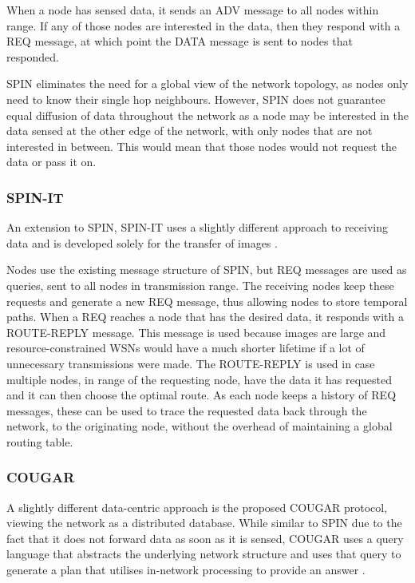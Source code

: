 When a node has sensed data, it sends an ADV message to all nodes within range. If any of those nodes are interested in the data, then they respond with a REQ message, at which point the DATA message is sent to nodes that responded.

SPIN eliminates the need for a global view of the network topology, as nodes only need to know their single hop neighbours. However, SPIN does not guarantee equal diffusion of data throughout the network as a node may be interested in the data sensed at the other edge of the network, with only nodes that are not interested in between. This would mean that those nodes would not request the data or pass it on.

\subsubsection{SPIN-IT}
	An extension to SPIN, SPIN-IT  uses a slightly different approach to receiving data and is developed solely for the transfer of images \cite{Woodrow2002}.
	
Nodes use the existing message structure of SPIN, but REQ messages are used as queries, sent to all nodes in transmission range. The receiving nodes keep these requests and generate a new REQ message, thus allowing nodes to store temporal paths. When a REQ reaches a node that has the desired data, it responds with a ROUTE-REPLY message. This message is used because images are large and resource-constrained WSNs would have a much shorter lifetime if a lot of unnecessary transmissions were made. The ROUTE-REPLY is used in case multiple nodes, in range of the requesting node, have the data it has requested and it can then choose the optimal route. As each node keeps a history of REQ messages, these can be used to trace the requested data back through the network, to the originating node, without the overhead of maintaining a global routing table.

\subsubsection{COUGAR}
	A slightly different data-centric approach is the proposed COUGAR protocol, viewing the network as a distributed database. While similar to SPIN due to the fact that it does not forward data as soon as it is sensed, COUGAR uses a query language that abstracts the underlying network structure and uses that query to generate a plan that utilises in-network processing to provide an answer \cite{Yao2002}.

